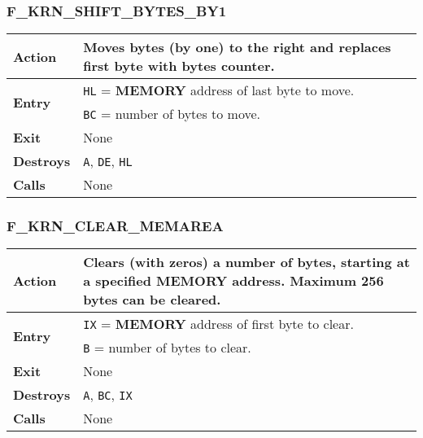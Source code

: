     \subsubsection{F\_KRN\_SHIFT\_BYTES\_BY1}
    \label{func:fkrnshiftbytesby1}
    \begin{tabular}{l p{15cm}}
        \hline\textbf{Action}
        & Moves bytes (by one) to the right and replaces first byte with
        bytes counter.\\
        \hline\multirow[t]{2}{4em}{\textbf{Entry}}
        & \texttt{HL} = \textbf{MEMORY} address of last byte to move.\\
        & \texttt{BC} = number of bytes to move.\\
        \hline\textbf{Exit} & None\\
        \hline\textbf{Destroys} & \texttt{A}, \texttt{DE}, \texttt{HL}\\
        \hline\textbf{Calls} & None\\
        \hline
    \end{tabular}

    \subsubsection{F\_KRN\_CLEAR\_MEMAREA}
    \label{func:fkrnclearmemarea}
    \begin{tabular}{l p{15cm}}
        \hline\textbf{Action}
        & Clears (with zeros) a number of bytes, starting at a specified
        \textbf{MEMORY} address. Maximum 256 bytes can be cleared.\\
        \hline\multirow[t]{2}{4em}{\textbf{Entry}}
        & \texttt{IX} = \textbf{MEMORY} address of first byte to clear.\\
        & \texttt{B} = number of bytes to clear.\\
        \hline\textbf{Exit} & None\\
        \hline\textbf{Destroys} & \texttt{A}, \texttt{BC}, \texttt{IX}\\
        \hline\textbf{Calls} & None\\
        \hline
    \end{tabular}

